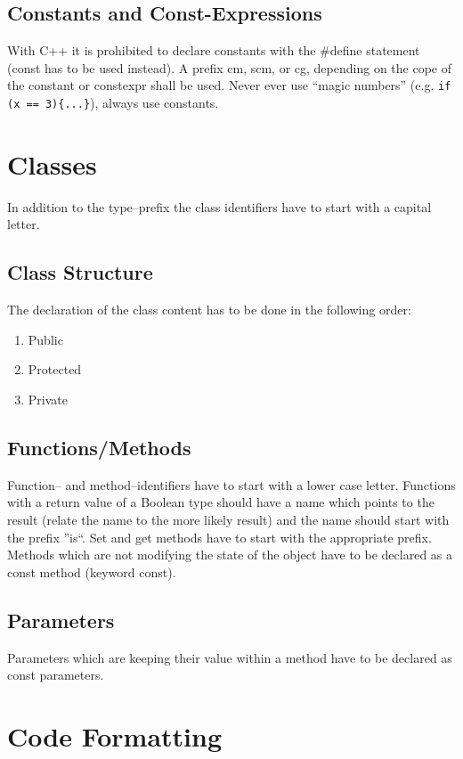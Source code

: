 \documentclass[final,a4paper,10pt, oneside]{article}
\begin{document}
\subsection{Constants and Const-Expressions}
 With C++ it is prohibited to declare constants with the \#define statement (const has to be used instead). 
 A prefix cm, scm, or cg, depending on the cope of the constant or constexpr shall be used.
 Never ever use ``magic numbers'' (e.g. \verb|if (x == 3){...}|), always use constants.


\section{Classes}
In addition to the type--prefix the class identifiers have to start with a capital letter.
\subsection{Class Structure}
 The declaration of the class content has to be done in the following order:
\begin{enumerate}
\item Public
\item Protected
\item Private
\end{enumerate}

\subsection{Functions/Methods}
Function-- and method--identifiers have to start with a lower case letter. Functions with a return value of a Boolean type should have a name which points to the result (relate the name to the more likely result) and the name should start with the prefix ''is``. Set and get methods have to start with the appropriate prefix. Methods which are not modifying the state of the object have to be declared as a const method (keyword const).

\subsection{Parameters}
Parameters which are keeping their value within a method have to be declared as const parameters.

\section{Code Formatting}
\end{document}
